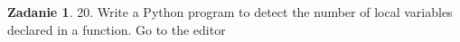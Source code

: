 \documentclass[11pt]{article}
\theoremstyle{definition}
\newtheorem{zadanie}{Zadanie}
\begin{document}
\begin{zadanie}


20. Write a Python program to detect the number of local variables declared in a function. Go to the editor


\end{zadanie}
%
%
%
%
%
%
%
%
%
%
%
%
%
%
%
%
%
%
%
%
%
%
%
\end{document}
